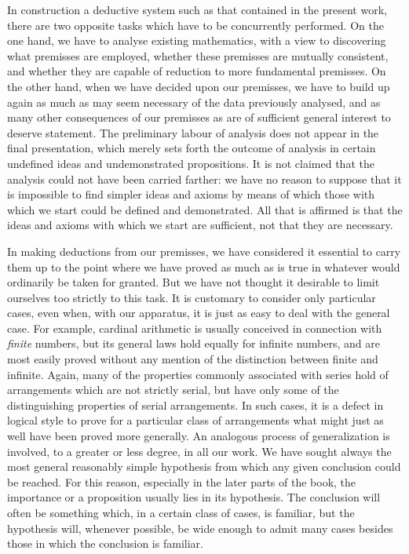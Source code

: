 \documentclass{scrartcl}
\begin{document}
In construction a deductive system such as that contained in the present work, there are two opposite tasks which have to be concurrently performed. On
the one hand, we have to analyse existing mathematics, with a view to discovering what premisses are employed, whether these premisses are mutually
consistent, and whether they are capable of reduction to more fundamental premisses. On the other hand, when we have decided upon our premisses,
we have to build up again as much as may seem necessary of the data previously analysed, and as many other consequences of our premisses as are of sufficient
general interest to deserve statement. The preliminary labour of analysis does not appear in the final presentation, which merely sets forth the outcome
of analysis in certain undefined ideas and undemonstrated propositions. It is not claimed that the analysis could not have been carried farther: we have
no reason to suppose that it is impossible to find simpler ideas and axioms by means of which those with which we start could be defined and demonstrated. All
that is affirmed is that the ideas and axioms with which we start are sufficient, not that they are necessary.

In making deductions from our premisses, we have considered it essential to carry them up to the point where we have proved as much as is true in whatever would
ordinarily be taken for granted. But we have not thought it desirable to limit ourselves too strictly to this task. It is customary to consider only particular
cases, even when, with our apparatus, it is just as easy to deal with the general case. For example, cardinal arithmetic is usually conceived in connection with
\textit{finite} numbers, but its general laws hold equally for infinite numbers, and are most easily proved without any mention of the distinction between finite
and infinite. Again, many of the properties commonly associated with series hold of arrangements which are not strictly serial, but have only some of the
distinguishing properties of serial arrangements. In such cases, it is a defect in logical style to prove for a particular class of arrangements what might just
as well have been proved more generally. An analogous process of generalization is involved, to a greater or less degree, in all our work. We have sought always
the most general reasonably simple hypothesis from which any given conclusion could be reached. For this reason, especially in the later parts of the book, the
importance or a proposition usually lies in its hypothesis. The conclusion will often be something which, in a certain class of cases, is familiar, but the hypothesis
will, whenever possible, be wide enough to admit many cases besides those in which the conclusion is familiar.
\end{document}
